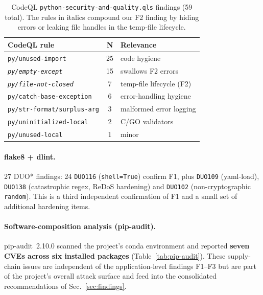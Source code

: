 \documentclass[conference]{IEEEtran}
\begin{document}
\begin{table}[t]
\caption{CodeQL \texttt{python-security-and-quality.qls} findings (59
total). The rules in italics compound our F2 finding by hiding errors
or leaking file handles in the temp-file lifecycle.}
\label{tab:codeql-summary}
\centering\renewcommand{\arraystretch}{1.15}
\begin{tabularx}{\columnwidth}{Xcl}
\toprule
\textbf{CodeQL rule} & \textbf{N} & \textbf{Relevance} \\
\midrule
\texttt{py/unused-import}              & 25 & code hygiene \\
\emph{\texttt{py/empty-except}}        & 15 & swallows F2 errors \\
\emph{\texttt{py/file-not-closed}}     & 7  & temp-file lifecycle (F2) \\
\texttt{py/catch-base-exception}       & 6  & error-handling hygiene \\
\texttt{py/str-format/surplus-arg}     & 3  & malformed error logging \\
\texttt{py/uninitialized-local}        & 2  & C/GO validators \\
\texttt{py/unused-local}               & 1  & minor \\
\bottomrule
\end{tabularx}
\end{table}

\paragraph{flake8 + dlint.}
27 DUO* findings: 24 \texttt{DUO116} (\texttt{shell=True}) confirm F1,
plus \texttt{DUO109} (yaml-load), \texttt{DUO138} (catastrophic regex,
ReDoS hardening) and \texttt{DUO102} (non-cryptographic
\texttt{random}). This is a third independent confirmation of F1 and a
small set of additional hardening items.

\paragraph{Software-composition analysis (pip-audit).}
pip-audit~2.10.0 scanned the project's conda environment and reported
\textbf{seven CVEs across six installed packages}
(Table~\ref{tab:pip-audit}). These supply-chain issues are independent
of the application-level findings F1--F3 but are part of the project's
overall attack surface and feed into the consolidated recommendations
of Sec.~\ref{sec:findings}.
\end{document}
